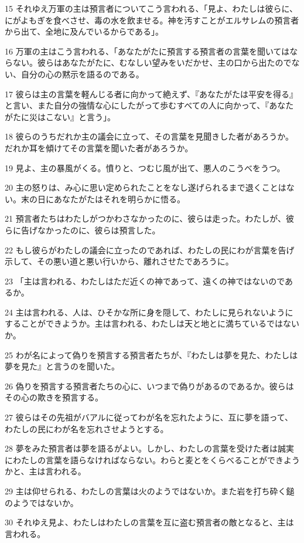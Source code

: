 \par 15 それゆえ万軍の主は預言者についてこう言われる、「見よ、わたしは彼らに、にがよもぎを食べさせ、毒の水を飲ませる。神を汚すことがエルサレムの預言者から出て、全地に及んでいるからである」。
\par 16 万軍の主はこう言われる、「あなたがたに預言する預言者の言葉を聞いてはならない。彼らはあなたがたに、むなしい望みをいだかせ、主の口から出たのでない、自分の心の黙示を語るのである。
\par 17 彼らは主の言葉を軽んじる者に向かって絶えず、『あなたがたは平安を得る』と言い、また自分の強情な心にしたがって歩むすべての人に向かって、『あなたがたに災はこない』と言う」。
\par 18 彼らのうちだれか主の議会に立って、その言葉を見聞きした者があろうか。だれか耳を傾けてその言葉を聞いた者があろうか。
\par 19 見よ、主の暴風がくる。憤りと、つむじ風が出て、悪人のこうべをうつ。
\par 20 主の怒りは、み心に思い定められたことをなし遂げられるまで退くことはない。末の日にあなたがたはそれを明らかに悟る。
\par 21 預言者たちはわたしがつかわさなかったのに、彼らは走った。わたしが、彼らに告げなかったのに、彼らは預言した。
\par 22 もし彼らがわたしの議会に立ったのであれば、わたしの民にわが言葉を告げ示して、その悪い道と悪い行いから、離れさせたであろうに。
\par 23 「主は言われる、わたしはただ近くの神であって、遠くの神ではないのであるか。
\par 24 主は言われる、人は、ひそかな所に身を隠して、わたしに見られないようにすることができようか。主は言われる、わたしは天と地とに満ちているではないか。
\par 25 わが名によって偽りを預言する預言者たちが、『わたしは夢を見た、わたしは夢を見た』と言うのを聞いた。
\par 26 偽りを預言する預言者たちの心に、いつまで偽りがあるのであるか。彼らはその心の欺きを預言する。
\par 27 彼らはその先祖がバアルに従ってわが名を忘れたように、互に夢を語って、わたしの民にわが名を忘れさせようとする。
\par 28 夢をみた預言者は夢を語るがよい。しかし、わたしの言葉を受けた者は誠実にわたしの言葉を語らなければならない。わらと麦とをくらべることができようかと、主は言われる。
\par 29 主は仰せられる、わたしの言葉は火のようではないか。また岩を打ち砕く鎚のようではないか。
\par 30 それゆえ見よ、わたしはわたしの言葉を互に盗む預言者の敵となると、主は言われる。
